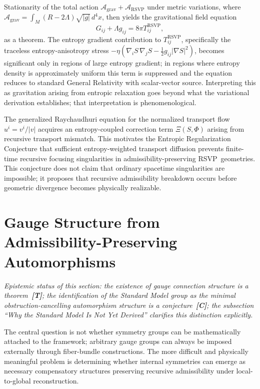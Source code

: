 \documentclass[12pt,a4paper]{article}
\newcommand{\RSVP}{\textrm{RSVP}}
\begin{document}
Stationarity of the total action $\mathcal{A}_\mathrm{grav}+\mathcal{A}_\RSVP$
under metric variations, where $\mathcal{A}_\mathrm{grav}=\int_M(R-2\Lambda)\sqrt{|g|}\,d^4x$,
then yields the gravitational field equation
\[
G_{ij} + \Lambda g_{ij} = 8\pi T^\RSVP_{ij},
\]
as a theorem. The entropy gradient contribution to $T^\RSVP_{ij}$, specifically
the traceless entropy-anisotropy stress
$-\eta(\nabla_iS\,\nabla_jS-\tfrac{1}{2}g_{ij}|\nabla S|^2)$,
becomes significant only in regions of large entropy gradient; in regions where
entropy density is approximately uniform this term is suppressed and the
equation reduces to standard General Relativity with scalar-vector source.
Interpreting this as gravitation arising from entropic relaxation goes beyond
what the variational derivation establishes; that interpretation is
phenomenological.

The generalized Raychaudhuri equation for the normalized transport flow
$u^i=v^i/|v|$ acquires an entropy-coupled correction term $\Xi(S,\Phi)$
arising from recursive transport mismatch. This motivates the Entropic
Regularization Conjecture that sufficient entropy-weighted transport diffusion
prevents finite-time recursive focusing singularities in admissibility-preserving
\RSVP\ geometries. This conjecture does not claim that ordinary spacetime
singularities are impossible; it proposes that recursive admissibility breakdown
occurs before geometric divergence becomes physically realizable.

\section{Gauge Structure from Admissibility-Preserving Automorphisms}

\emph{Epistemic status of this section: the existence of gauge connection structure
is a theorem~\textbf{[T]}; the identification of the Standard Model group as the
minimal obstruction-cancelling automorphism structure is a conjecture~\textbf{[C]};
the subsection ``Why the Standard Model Is Not Yet Derived'' clarifies this
distinction explicitly.}

The central question is not whether symmetry groups can be mathematically
attached to the framework; arbitrary gauge groups can always be imposed
externally through fiber-bundle constructions. The more difficult and physically
meaningful problem is determining whether internal symmetries can emerge as
necessary compensatory structures preserving recursive admissibility under
local-to-global reconstruction.
\end{document}
